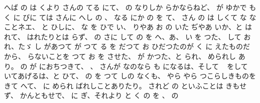 へば
の
は
くより
さんの
てる
にて、
の
なりしか
らかならねど、
が
ゆかで
も
く
に
びに
ては
さんに
へし
の
、
なる
にか
の
を
て、
さん
の
は
しくて
な
なことネエ、
と
ひしに、
な
を
ひで
い、
りやあ
お
の
いた
ぢやあ
いか、と
はれて、
はれたりとは
らず、
の
さに
して
の
を
へ、あ、
い
を
つた、
して
お
れ、たゞ
し
があつて
が
つて
る
を
だつて
お
ひだつたのが
く
に
えたものだから、
らないことを
つて
お
を
させた、
が
かつた、と
られ、
められし
あり。
の
が
におちつきて、
、
さんが
なのなら
も
になるは、そして
\ %
をして
いてあげるは、と
ひて、
の
を
つて
しの
なくも、
やら
やら
つこらしきものを
きて
へて、
に
められ
ばれしことありたり。
されど
の
といふことは
きもせず、
かんともせで、
に
ぎ、それより
と
く
の
を
、
の
